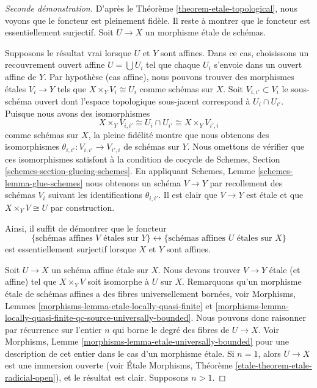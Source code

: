 \begin{proof}[Seconde d\'emonstration]
D'apr\`es le Th\'eor\`eme \ref{theorem-etale-topological},
nous voyons que le foncteur est pleinement fid\`ele.
Il reste \`a montrer que le foncteur est essentiellement surjectif.
Soit $U \to X$ un morphisme \'etale de sch\'emas.

\medskip\noindent
Supposons le r\'esultat vrai lorsque $U$ et $Y$ sont affines.
Dans ce cas, choisissons un recouvrement ouvert affine
$U = \bigcup U_i$ tel que chaque $U_i$ s'envoie
dans un ouvert affine de $Y$. Par hypoth\`ese (cas affine), nous pouvons
trouver des morphismes \'etales $V_i \to Y$ tels que $X \times_Y V_i \cong U_i$
comme sch\'emas sur $X$. Soit $V_{i, i'} \subset V_i$
le sous-sch\'ema ouvert dont l'espace topologique sous-jacent
correspond \`a $U_i \cap U_{i'}$. Puisque nous avons des isomorphismes
$$
X \times_Y V_{i, i'} \cong U_i \cap U_{i'} \cong X \times_Y V_{i', i}
$$
comme sch\'emas sur $X$, la pleine fid\'elit\'e montre que nous
obtenons des isomorphismes
$\theta_{i, i'} : V_{i, i'} \to V_{i', i}$ de sch\'emas sur $Y$.
Nous omettons de v\'erifier que ces isomorphismes satisfont \`a la
condition de cocycle de Schemes, Section \ref{schemes-section-glueing-schemes}.
En appliquant Schemes, Lemme \ref{schemes-lemma-glue-schemes}
nous obtenons un sch\'ema $V \to Y$ par
recollement des sch\'emas $V_i$ suivant les identifications $\theta_{i, i'}$.
Il est clair que $V \to Y$ est \'etale et que $X \times_Y V \cong U$
par construction.

\medskip\noindent
Ainsi, il suffit de d\'emontrer que le foncteur
\begin{equation}
\label{equation-affine-etale}
\{
\text{sch\'emas affines }V\text{ \'etales sur }Y
\}
\leftrightarrow
\{
\text{sch\'emas affines }U\text{ \'etales sur }X
\}
\end{equation}
est essentiellement surjectif lorsque $X$ et $Y$ sont affines.

\medskip\noindent
Soit $U \to X$ un sch\'ema affine \'etale sur $X$.
Nous devons trouver $V \to Y$ \'etale (et affine) tel que $X \times_Y V$
soit isomorphe \`a $U$ sur $X$. Remarquons qu'un morphisme \'etale de sch\'emas affines
a des fibres universellement born\'ees, voir
Morphisms,
Lemmes \ref{morphisms-lemma-etale-locally-quasi-finite} et
\ref{morphisms-lemma-locally-quasi-finite-qc-source-universally-bounded}.
Nous pouvons donc raisonner par r\'ecurrence sur l'entier $n$ qui borne le degr\'e des fibres
de $U \to X$. Voir
Morphisms, Lemme \ref{morphisms-lemma-etale-universally-bounded}
pour une description de cet entier dans le cas d'un morphisme \'etale.
Si $n = 1$, alors $U \to X$ est une immersion ouverte (voir
\'Etale Morphisms, Th\'eor\`eme \ref{etale-theorem-etale-radicial-open}),
et le r\'esultat est clair. Supposons $n > 1$.


\end{proof}
